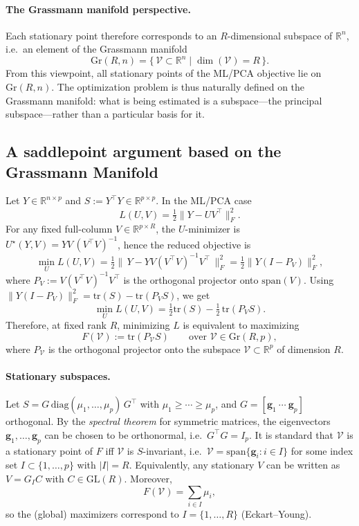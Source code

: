 \documentclass[11pt]{article}
\theoremstyle{spaced}
\begin{document}
\paragraph{The Grassmann manifold perspective.}
Each stationary point therefore corresponds to an \(R\)-dimensional subspace of
\(\mathbb{R}^n\), i.e.\ an element of the Grassmann manifold
\[
\mathrm{Gr}(R,n)
  = \{\, \mathcal{V} \subset \mathbb{R}^n \mid \dim(\mathcal{V}) = R \,\}.
\]
From this viewpoint, all stationary points of the ML/PCA objective lie on
\(\mathrm{Gr}(R,n)\). The optimization problem is thus naturally defined on the
Grassmann manifold: what is being estimated is a subspace---the principal
subspace---rather than a particular basis for it.

\subsection{A saddlepoint argument based on the Grassmann Manifold}

Let \(Y \in \mathbb{R}^{n \times p}\) and \(S := Y^\top Y \in \mathbb{R}^{p \times p}\). In the ML/PCA case
\[
L(U,V) = \tfrac{1}{2}\|Y - UV^\top\|_F^2.
\]
For any fixed full-column \(V \in \mathbb{R}^{p \times R}\), the \(U\)-minimizer is
\(U^\star(Y,V) = YV\,(V^\top V)^{-1}\), hence the reduced objective is
\[
\min_U L(U,V) = \tfrac{1}{2}\|\,Y - YV(V^\top V)^{-1}V^\top\,\|_F^2
= \tfrac{1}{2}\|Y(I - P_V)\|_F^2,
\]
where \(P_V := V(V^\top V)^{-1}V^\top\) is the orthogonal projector onto
\(\mathrm{span}(V)\). Using \(\|Y(I - P_V)\|_F^2 = \mathrm{tr}(S) - \mathrm{tr}(P_V S)\),
we get
\[
\min_U L(U,V) = \tfrac{1}{2}\mathrm{tr}(S) - \tfrac{1}{2}\,\mathrm{tr}(P_V S).
\]
Therefore, at fixed rank \(R\), minimizing \(L\) is equivalent to maximizing
\[
F(\mathcal{V}) := \mathrm{tr}(P_{\mathcal{V}}S) \qquad \text{over } \mathcal{V} \in \mathrm{Gr}(R,p),
\]
where \(P_{\mathcal{V}}\) is the orthogonal projector onto the subspace
\(\mathcal{V} \subset \mathbb{R}^p\) of dimension \(R\).

\paragraph{Stationary subspaces.}
Let \(S = G\,\mathrm{diag}(\mu_1,\ldots,\mu_p)\,G^\top\) with \(\mu_1 \ge \cdots \ge \mu_p\), and \(G = [\mathbf{g}_1\ \cdots\ \mathbf{g}_p]\) orthogonal.
By the \emph{spectral theorem} for symmetric matrices, the eigenvectors
\(\mathbf{g}_1,\ldots,\mathbf{g}_p\) can be chosen to be orthonormal, i.e.\ \(G^\top G = I_p\).
It is standard that \(\mathcal{V}\) is a stationary point of \(F\) iff
\(\mathcal{V}\) is \(S\)-invariant, i.e.\ \(\mathcal{V} = \mathrm{span}\{\mathbf{g}_i : i \in I\}\)
for some index set \(I \subset \{1,\ldots,p\}\) with \(|I| = R\).
Equivalently, any stationary \(V\) can be written as \(V = G_I C\) with \(C \in \mathrm{GL}(R)\).
Moreover,
\[
F(\mathcal{V}) = \sum_{i \in I} \mu_i,
\]
so the (global) maximizers correspond to \(I = \{1,\ldots,R\}\) (Eckart--Young).
\end{document}
